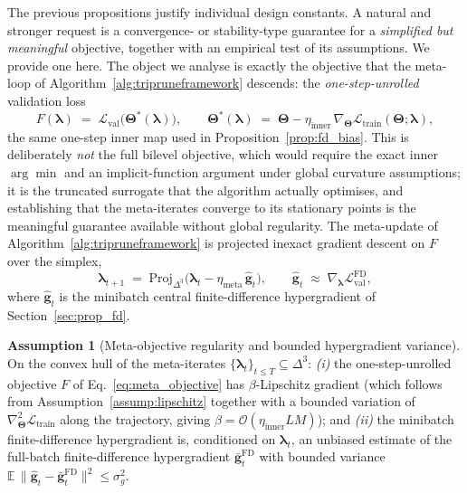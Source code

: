 \documentclass[10pt]{article}
\theoremstyle{plain}
\theoremstyle{definition}
\newtheorem{assumption}{Assumption}
\begin{document}
The previous propositions justify individual design constants. A natural and stronger request is a convergence- or stability-type guarantee for a \emph{simplified but meaningful} objective, together with an empirical test of its assumptions. We provide one here. The object we analyse is exactly the objective that the meta-loop of Algorithm~\ref{alg:tripruneframework} descends: the \emph{one-step-unrolled} validation loss
\begin{equation}
F(\boldsymbol{\lambda}) \;=\; \mathcal{L}_{\mathrm{val}}\!\big(\boldsymbol{\Theta}^{\!*}(\boldsymbol{\lambda})\big),
\qquad
\boldsymbol{\Theta}^{\!*}(\boldsymbol{\lambda}) \;=\; \boldsymbol{\Theta} - \eta_{\mathrm{inner}}\,\nabla_{\boldsymbol{\Theta}}\mathcal{L}_{\mathrm{train}}(\boldsymbol{\Theta};\boldsymbol{\lambda}),
\label{eq:meta_objective}
\end{equation}
the same one-step inner map used in Proposition~\ref{prop:fd_bias}. This is deliberately \emph{not} the full bilevel objective, which would require the exact inner $\arg\min$ and an implicit-function argument under global curvature assumptions; it is the truncated surrogate that the algorithm actually optimises, and establishing that the meta-iterates converge to its stationary points is the meaningful guarantee available without global regularity. The meta-update of Algorithm~\ref{alg:tripruneframework} is projected inexact gradient descent on $F$ over the simplex,
\begin{equation}
\boldsymbol{\lambda}_{t+1} \;=\; \mathrm{Proj}_{\Delta^{3}}\!\big(\boldsymbol{\lambda}_t - \eta_{\mathrm{meta}}\,\widehat{\mathbf{g}}_t\big),
\qquad
\widehat{\mathbf{g}}_t \;\approx\; \nabla_{\boldsymbol{\lambda}}\mathcal{L}_{\mathrm{val}}^{\mathrm{FD}},
\label{eq:meta_update}
\end{equation}
where $\widehat{\mathbf{g}}_t$ is the minibatch central finite-difference hypergradient of Section~\ref{sec:prop_fd}.

\begin{assumption}[Meta-objective regularity and bounded hypergradient variance]
\label{assump:meta}
On the convex hull of the meta-iterates $\{\boldsymbol{\lambda}_t\}_{t\le T}\subseteq\Delta^{3}$: \emph{(i)} the one-step-unrolled objective $F$ of Eq.~\eqref{eq:meta_objective} has $\beta$-Lipschitz gradient (which follows from Assumption~\ref{assump:lipschitz} together with a bounded variation of $\nabla^{2}_{\boldsymbol{\Theta}}\mathcal{L}_{\mathrm{train}}$ along the trajectory, giving $\beta=\mathcal{O}(\eta_{\mathrm{inner}}LM)$); and \emph{(ii)} the minibatch finite-difference hypergradient is, conditioned on $\boldsymbol{\lambda}_t$, an unbiased estimate of the full-batch finite-difference hypergradient $\bar{\mathbf{g}}_t^{\mathrm{FD}}$ with bounded variance $\mathbb{E}\,\|\widehat{\mathbf{g}}_t-\bar{\mathbf{g}}_t^{\mathrm{FD}}\|^{2}\le\sigma_g^{2}$.
\end{assumption}
\end{document}
